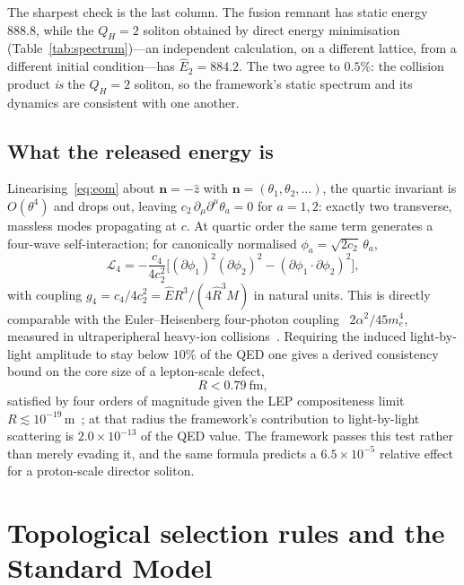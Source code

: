 \documentclass[aps,prd,preprint,nofootinbib,longbibliography]{revtex4-2}
\newcommand{\nv}{\bm{n}}
\newcommand{\Qh}{Q_H}
\newcommand{\Ehat}{\hat{E}}
\newcommand{\Rhat}{\hat{R}}
\begin{document}
The sharpest check is the last column. The fusion remnant has static energy
$888.8$, while the $\Qh=2$ soliton obtained by direct energy minimisation
(Table~\ref{tab:spectrum})---an independent calculation, on a different lattice,
from a different initial condition---has $\Ehat_2=884.2$. The two agree to
$0.5\%$: the collision product \emph{is} the $\Qh=2$ soliton, so the framework's
static spectrum and its dynamics are consistent with one another.

\subsection{What the released energy is}

Linearising~\eqref{eq:eom} about $\nv=-\hat z$ with $\nv=(\theta_1,\theta_2,
\ldots)$, the quartic invariant is $O(\theta^4)$ and drops out, leaving
$c_2\,\partial_\mu\partial^\mu\theta_a=0$ for $a=1,2$: exactly two transverse,
massless modes propagating at $c$. At quartic order the same term generates a
four-wave self-interaction; for canonically normalised
$\phi_a=\sqrt{2c_2}\,\theta_a$,
\begin{equation}
\mathcal{L}_4=-\frac{c_4}{4c_2^2}\Big[(\partial\phi_1)^2(\partial\phi_2)^2
-(\partial\phi_1\!\cdot\!\partial\phi_2)^2\Big],
\end{equation}
with coupling $g_4=c_4/4c_2^2=\Ehat R^3/(4\Rhat^3M)$ in natural units. This is
directly comparable with the Euler--Heisenberg four-photon
coupling~\cite{eulerheisenberg1936} $2\alpha^2/45m_e^4$, measured in
ultraperipheral heavy-ion collisions~\cite{atlaslbl2019}. Requiring the induced
light-by-light amplitude to stay below $10\%$ of the QED one gives a derived
consistency bound on the core size of a lepton-scale defect,
\begin{equation}
R<0.79\ \mathrm{fm},
\end{equation}
satisfied by four orders of magnitude given the LEP compositeness limit
$R\lesssim10^{-19}\,$m~\cite{bourilkov2001}; at that radius the framework's
contribution to light-by-light scattering is $2.0\times10^{-13}$ of the QED
value. The framework passes this test rather than merely evading it, and the same
formula predicts a $6.5\times10^{-5}$ relative effect for a proton-scale director
soliton.

\section{Topological selection rules and the Standard Model}
\label{sec:sm}
\end{document}
